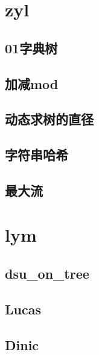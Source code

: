 \section{zyl}
\subsection{01字典树}
\raggedbottom
\hrulefill

\subsection{加减mod}
\raggedbottom
\hrulefill

\subsection{动态求树的直径}
\raggedbottom
\hrulefill

\subsection{字符串哈希}
\raggedbottom
\hrulefill

\subsection{最大流}
\raggedbottom
\hrulefill

\section{lym}
\subsection{dsu\_on\_tree}
\raggedbottom
\hrulefill

\subsection{Lucas}
\raggedbottom
\hrulefill

\subsection{Dinic}
\raggedbottom
\hrulefill

